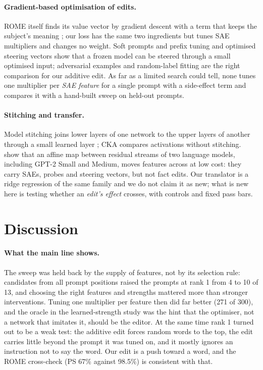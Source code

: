 \documentclass[11pt,twocolumn]{article}
\begin{document}
\paragraph{Gradient-based optimisation of edits.} ROME itself finds its value vector by gradient descent with a term that keeps the subject's meaning \citep{meng2022}; our loss has the same two ingredients but tunes SAE multipliers and changes no weight. Soft prompts and prefix tuning \citep{lester2021,li2021} and optimised steering vectors \citep{subramani2022,dunefsky2025} show that a frozen model can be steered through a small optimised input; adversarial examples \citep{szegedy2014,goodfellow2015} and random-label fitting \citep{zhang2017} are the right comparison for our additive edit. As far as a limited search could tell, none tunes one multiplier per \emph{SAE feature} for a single prompt with a side-effect term and compares it with a hand-built sweep on held-out prompts.

\paragraph{Stitching and transfer.} Model stitching joins lower layers of one network to the upper layers of another through a small learned layer \citep{lenc2015,bansal2021}; CKA \citep{kornblith2019} compares activations without stitching. \citet{chen2025} show that an affine map between residual streams of two language models, including GPT-2 Small and Medium, moves features across at low cost: they carry SAEs, probes and steering vectors, but not fact edits. Our translator is a ridge regression of the same family and we do not claim it as new; what is new here is testing whether an \emph{edit's effect} crosses, with controls and fixed pass bars.

\section{Discussion}
\label{sec:discussion}

\paragraph{What the main line shows.} The sweep was held back by the supply of features, not by its selection rule: candidates from all prompt positions raised the prompts at rank 1 from 4 to 10 of 13, and choosing the right features and strengths mattered more than stronger interventions. Tuning one multiplier per feature then did far better (271 of 300), and the oracle in the learned-strength study was the hint that the optimiser, not a network that imitates it, should be the editor. At the same time rank 1 turned out to be a weak test: the additive edit forces random words to the top, the edit carries little beyond the prompt it was tuned on, and it mostly ignores an instruction not to say the word. Our edit is a push toward a word, and the ROME cross-check (PS 67\% against 98.5\%) is consistent with that.
\end{document}
